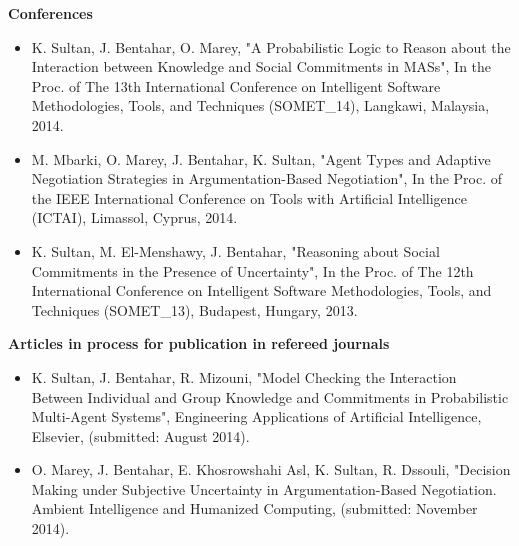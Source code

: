 \textbf{Conferences}

\begin{itemize}

\item K. Sultan, J. Bentahar, O. Marey, "A Probabilistic Logic to Reason about the Interaction between Knowledge and Social Commitments in MASs", In the Proc. of The 13th International Conference on Intelligent Software Methodologies, Tools, and Techniques (SOMET\_14), Langkawi, Malaysia, 2014.

\item M. Mbarki, O. Marey, J. Bentahar, K. Sultan,  "Agent Types and Adaptive Negotiation Strategies in Argumentation-Based Negotiation", In the Proc. of the IEEE International Conference on Tools with Artificial Intelligence (ICTAI), Limassol, Cyprus, 2014.

\item K. Sultan, M. El-Menshawy, J. Bentahar, "Reasoning about Social Commitments in the Presence of Uncertainty", In the Proc. of The 12th International Conference on Intelligent Software Methodologies, Tools, and Techniques (SOMET\_13), Budapest, Hungary, 2013.
\end{itemize}

\textbf{Articles in process for publication in refereed journals}

\begin{itemize}
\item K. Sultan, J. Bentahar, R. Mizouni, "Model Checking the Interaction Between Individual and Group Knowledge and Commitments in Probabilistic Multi-Agent Systems", Engineering Applications of Artificial Intelligence, Elsevier, (submitted: August 2014).
\item O. Marey, J. Bentahar, E. Khosrowshahi Asl, K. Sultan, R. Dssouli, "Decision Making under Subjective Uncertainty in Argumentation-Based Negotiation.  Ambient Intelligence and Humanized Computing, (submitted: November 2014).
\end{itemize}

